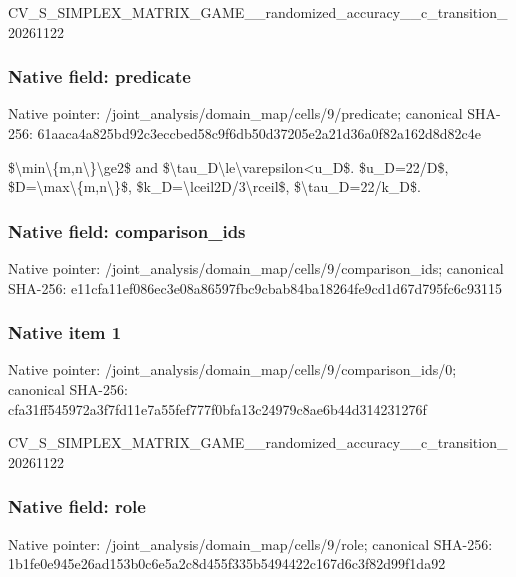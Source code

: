 \documentclass[10pt,a4paper]{article}
\begin{document}
CV\_S\_SIMPLEX\_MATRIX\_GAME\allowbreak{}\_\_randomized\_accuracy\_\_c\allowbreak{}\_transition\_20261122


\subsubsection{Native field: predicate}


Native pointer: /joint\_analysis/domain\_m\allowbreak{}ap/cells/9/predicate; canonical SHA-256: 61aaca4a825bd92c3eccbed5\allowbreak{}8c9f6db50d37205e2a21d36a\allowbreak{}0f82a162d8d82c4e


\$\textbackslash{}min\textbackslash{}\{m,n\textbackslash{}\}\textbackslash{}ge2\$ and \$\textbackslash{}tau\_D\textbackslash{}le\textbackslash{}varepsilon<u\_D\$. \$u\_D=22/D\$, \$D=\textbackslash{}max\textbackslash{}\{m,n\textbackslash{}\}\$, \$k\_D=\textbackslash{}lceil2D/3\textbackslash{}rceil\$, \$\textbackslash{}tau\_D=22/k\_D\$.


\subsubsection{Native field: comparison\_ids}


Native pointer: /joint\_analysis/domain\_m\allowbreak{}ap/cells/9/comparison\_id\allowbreak{}s; canonical SHA-256: e11cfa11ef086ec3e08a8659\allowbreak{}7fbc9cbab84ba18264fe9cd1\allowbreak{}d67d795fc6c93115



\subsubsection{Native item 1}


Native pointer: /joint\_analysis/domain\_m\allowbreak{}ap/cells/9/comparison\_id\allowbreak{}s/0; canonical SHA-256: cfa31ff545972a3f7fd11e7a\allowbreak{}55fef777f0bfa13c24979c8a\allowbreak{}e6b44d314231276f


CV\_S\_SIMPLEX\_MATRIX\_GAME\allowbreak{}\_\_randomized\_accuracy\_\_c\allowbreak{}\_transition\_20261122


\subsubsection{Native field: role}


Native pointer: /joint\_analysis/domain\_map/cells/9/role; canonical SHA-256: 1b1fe0e945e26ad153b0c6e5\allowbreak{}a2c8d455f335b5494422c167\allowbreak{}d6c3f82d99f1da92
\end{document}
